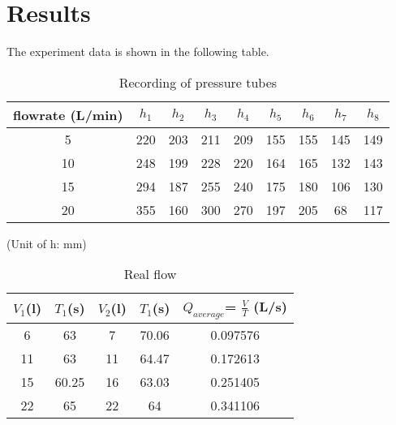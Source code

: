 \section{Results}
\label{sec:results}

The experiment data is shown in the following table.

\begin{table}[h]
    \centering
    \begin{tabular}{c|cccccccc}
    \hline
    flowrate (L/min)   & $h_1$   & $h_2$   & $h_3$  & $h_4$  & $h_5$  & $h_6$  & $h_7$  & $h_8$  \\ \hline
    5  & 220 & 203 & 211 & 209 & 155 & 155 & 145 & 149 \\
    10 & 248 & 199 & 228 & 220 & 164 & 165 & 132 & 143 \\
    15 & 294 & 187 & 255 & 240 & 175 & 180 & 106 & 130 \\
    20 & 355 & 160 & 300 & 270 & 197 & 205 & 68  & 117 \\ \hline
    \end{tabular}

    (Unit of h: mm)
    \caption{Recording of pressure tubes}
    \label{Bt2}
\end{table}

\begin{table}[h]
    \centering
\begin{tabular}{ccccc}
    \toprule
    $V_1$(l)  & $T_1$(s)&            $V_2$(l)                 & $T_1$(s)& $Q_{average} $= $\frac{V}{T}$ (L/s)  \\
    \midrule
6  & 63    & 7  & 70.06 &  0.097576 \\
11 & 63    & 11 & 64.47 &  0.172613 \\
15 & 60.25 & 16 & 63.03 &  0.251405 \\
22 & 65    & 22 & 64    &  0.341106 \\
    \bottomrule
\end{tabular}
\caption{Real flow}
\label{Bt3}
\end{table}
































\FloatBarrier %



